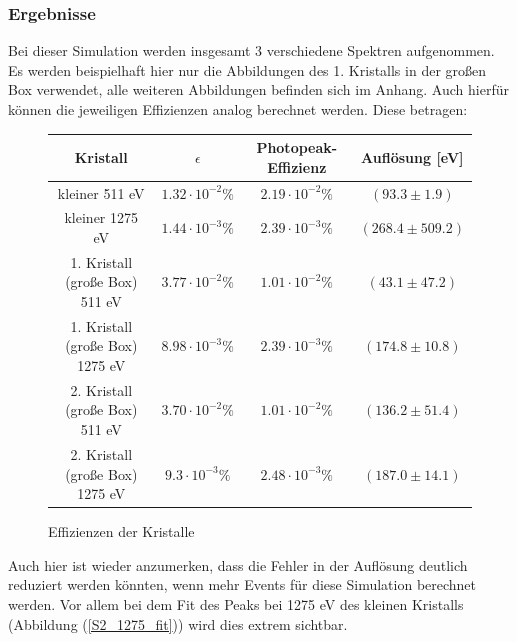 \documentclass[a4paper,14pt,twoside]{article}
\begin{document}
		\subsubsection{Ergebnisse}
			Bei dieser Simulation werden insgesamt 3 verschiedene Spektren aufgenommen. Es werden beispielhaft hier nur die Abbildungen des 1. Kristalls in der großen Box verwendet, alle weiteren Abbildungen befinden sich im Anhang.
			Auch hierfür können die jeweiligen Effizienzen analog berechnet werden. Diese betragen: \\
			\begin{figure}[H]
			\begin{center}
			
			
			\begin{tabular}{|c|c|c|c|}
			\hline 
			\rule[-1ex]{0pt}{2.5ex} Kristall & $\epsilon$ & Photopeak-Effizienz & Auflösung [eV]\\ 
			\hline 
			\rule[-1ex]{0pt}{2.5ex} kleiner 511 eV & $1.32\cdot 10^{-2}\%$ & $2.19\cdot 10^{-2}\%$ & $(93.3\pm 1.9)$ \\ 
			\hline 
			\rule[-1ex]{0pt}{2.5ex} kleiner 1275 eV & $1.44\cdot 10^{-3}\%$ & $2.39\cdot 10^{-3}\%$ &  $(268.4\pm 509.2)$\\ 
			\hline 
			\rule[-1ex]{0pt}{2.5ex} 1. Kristall (große Box) 511 eV &  $3.77\cdot 10^{-2}\%$ & $1.01\cdot 10^{-2}\%$ & $(43.1\pm 47.2 )$\\ 
			\hline 
			\rule[-1ex]{0pt}{2.5ex} 1. Kristall (große Box) 1275 eV & $8.98\cdot 10^{-3}\%$ & $2.39\cdot 10^{-3}\%$ & $(174.8\pm 10.8)$ \\ 
			\hline 
			\rule[-1ex]{0pt}{2.5ex} 2. Kristall (große Box) 511 eV & $3.70\cdot 10^{-2}\%$ & $1.01\cdot 10^{-2}\%$ & $(136.2\pm 51.4)$ \\ 
			\hline 
			\rule[-1ex]{0pt}{2.5ex} 2. Kristall (große Box) 1275 eV & $9.3\cdot 10^{-3}\%$ & $2.48\cdot 10^{-3}\%$ & $(187.0\pm 14.1)$ \\ 
			\hline 
			\end{tabular}
			\end{center}
			\caption{Effizienzen der Kristalle}
			\end{figure}
			
			Auch hier ist wieder anzumerken, dass die Fehler in der Auflösung deutlich reduziert werden könnten, wenn mehr Events für diese Simulation berechnet werden. Vor allem bei dem Fit des Peaks bei 1275 eV des kleinen Kristalls (Abbildung (\ref{S2_1275_fit})) wird dies extrem sichtbar. 
			
\end{document}
